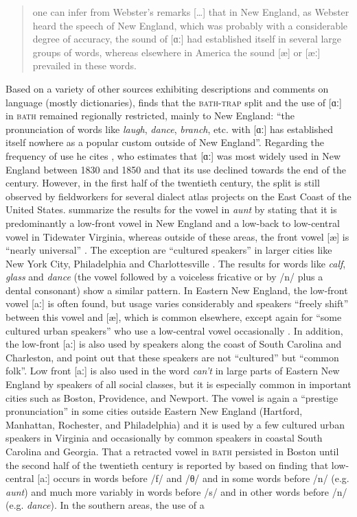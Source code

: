 \begin{quote}
one can infer from Webster’s remarks […] that in New England, as Webster heard the speech of New England, which was probably with a considerable degree of accuracy, the sound of [ɑː] had established itself in several large groups of words, whereas elsewhere in America the sound [æ] or [æː] prevailed in these words. \citep[68]{Krapp19252}
\end{quote}


Based on a variety of other sources exhibiting descriptions and comments on language (mostly dictionaries), \citet[69]{Krapp19252} finds that the \textsc{bath-trap} split and the use of [ɑː] in \textsc{bath} remained regionally restricted, mainly to New England: “the pronunciation of words like \emph{laugh}, \emph{dance}, \emph{branch}, etc. with [ɑː] has established itself nowhere as a popular custom outside of New England”. Regarding the frequency of use he cites \citet{Grandgent1899}, who estimates that [ɑː] was most widely used in New England between 1830 and 1850 and that its use declined towards the end of the century. However, in the first half of the twentieth century, the split is still observed by fieldworkers for several dialect atlas projects on the East Coast of the United States. \citet{Kurath1961} summarize the results for the vowel in \emph{aunt} by stating that it is predominantly a low-front vowel in New England and a low-back to low-central vowel in Tidewater Virginia, whereas outside of these areas, the front vowel [æ] is “nearly universal” \citep[135]{Kurath1961}. The exception are “cultured speakers” in larger cities like New York City, Philadelphia and Charlottesville \citep[135]{Kurath1961}. The results for words like \emph{calf}, \emph{glass} and \emph{dance} (the vowel followed by a voiceless fricative or by /n/ plus a dental consonant) show a similar pattern. In Eastern New England, the low-front vowel [aː] is often found, but usage varies considerably and speakers “freely shift” between this vowel and [æ], which is common elsewhere, except again for “some cultured urban speakers” who use a low-central vowel occasionally \citep[136]{Kurath1961}. In addition, the low-front [aː] is also used by speakers along the coast of South Carolina and Charleston, and \citet[136]{Kurath1961} point out that these speakers are not “cultured” but “common folk”. Low front [aː] is also used in the word \emph{can’t} in large parts of Eastern New England by speakers of all social classes, but it is especially common in important cities such as Boston, Providence, and Newport. The vowel is again a “prestige pronunciation” in some cities outside Eastern New England (Hartford, Manhattan, Rochester, and Philadelphia) and it is used by a few cultured urban speakers in Virginia and occasionally by common speakers in coastal South Carolina and Georgia. That a retracted vowel in \textsc{bath} persisted in Boston until the second half of the twentieth century is reported by \citet[56]{Nagy2008} based on  finding that low-central [aː] occurs in words before /f/ and /θ/ and in some words before /n/ (e.g. \emph{aunt}) and much more variably in words before /s/ and in other words before /n/ (e.g. \emph{dance}). In the southern areas, the use of a 